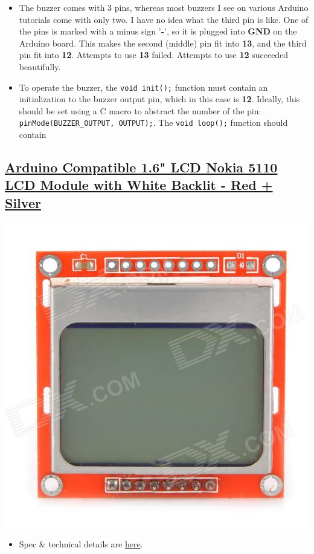 \documentclass[11pt]{article}
\begin{document}
\begin{itemize}
\item The buzzer comes with 3 pins, whereas most buzzers I see on various Arduino tutorials come with only two. I have no idea what the third pin is like. One of the pins is marked with a minus sign '\textbf{-}', so it is plugged into \textbf{GND} on the Arduino board. This makes the second (middle) pin fit into \textbf{13}, and the third pin fit into \textbf{12}. Attempts to use \textbf{13} failed. Attempts to use \textbf{12} succeeded beautifully.
\item To operate the buzzer, the \texttt{void init();} function must contain an initialization to the buzzer output pin, which in this case is \textbf{12}. Ideally, this should be set using a C macro to abstract the number of the pin: \texttt{pinMode(BUZZER\_OUTPUT, OUTPUT);}. The \texttt{void loop();} function should contain
\end{itemize}
\subsection{\href{http://dx.com/p/arduino-1-6-lcd-display-screen-for-nokia-5110-red-silver-140226}{Arduino Compatible 1.6" LCD Nokia 5110 LCD Module with White Backlit - Red + Silver}}
\label{sec-4-5}
\includegraphics[width=.9\linewidth]{./files/sku_140226_1.jpg}

\begin{itemize}
\item Spec \& technical details are \href{https://www.sparkfun.com/products/10168}{here}.
\end{itemize}
\end{document}
